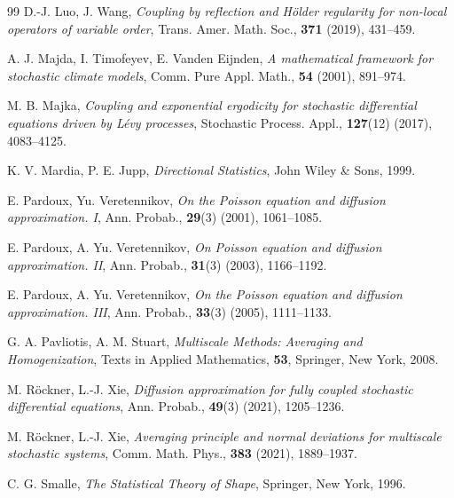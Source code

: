 \documentclass[11pt,reqno]{amsart}
\numberwithin{equation}{section}
\begin{document}
\begin{thebibliography}{99}
	 D.-J. Luo, J. Wang, \textit{Coupling by reflection and Hölder regularity for non-local operators of variable order}, Trans. Amer. Math. Soc., \textbf{371} (2019), 431–459.
	

 A. J. Majda, I. Timofeyev, E. Vanden Eijnden, \textit{A mathematical framework for stochastic climate models}, Comm. Pure Appl. Math., \textbf{54} (2001), 891–974.

    
	 M. B. Majka, \textit{Coupling and exponential ergodicity for stochastic differential equations driven by Lévy processes}, Stochastic Process. Appl., \textbf{127}(12) (2017), 4083–4125.
	
	 K. V. Mardia, P. E. Jupp, \textit{Directional Statistics}, John Wiley \& Sons, 1999.
	
	 E. Pardoux, Yu. Veretennikov, \textit{On the Poisson equation and diffusion approximation. I}, Ann. Probab., \textbf{29}(3) (2001), 1061–1085.
	
	 E. Pardoux, A. Yu. Veretennikov, \textit{On Poisson equation and diffusion approximation. II}, Ann. Probab., \textbf{31}(3) (2003), 1166–1192.
	
	 E. Pardoux, A. Yu. Veretennikov, \textit{On the Poisson equation and diffusion approximation. III}, Ann. Probab., \textbf{33}(3) (2005), 1111–1133.

     G. A. Pavliotis, A. M. Stuart, \textit{Multiscale Methods: Averaging and Homogenization}, Texts in Applied Mathematics, \textbf{53}, Springer, New York, 2008.
	
	
	 M. Röckner, L.-J. Xie, \textit{Diffusion approximation for fully coupled stochastic differential equations}, Ann. Probab., \textbf{49}(3) (2021), 1205–1236.
	
	 M. Röckner, L.-J. Xie, \textit{Averaging principle and normal deviations for multiscale stochastic systems}, Comm. Math. Phys., \textbf{383} (2021), 1889–1937.
	
	 C. G. Smalle, \textit{The Statistical Theory of Shape}, Springer, New York, 1996.
	

\end{thebibliography}
\end{document}
